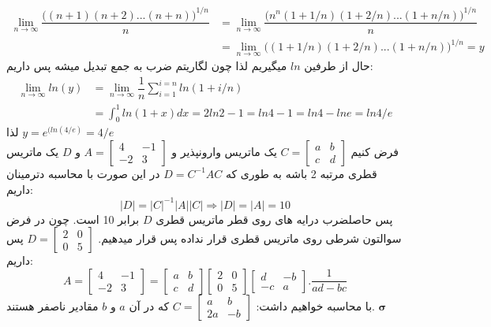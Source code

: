  
\begin{align*} 
\lim_{n\rightarrow \infty } \dfrac{{\Big( (n+1) (n+2)... (n+n)\Big)}^{1/n}}{n}&=\lim_{n\rightarrow \infty } \dfrac{{\Big(n^n (1+1/n) (1+2/n)... (1+n/n)\Big)}^{1/n} }{n} \\
&=\lim_{n\rightarrow \infty} {\Big((1+1/n) (1+2/n)... (1+n/n)\Big)}^{1/n}=y
\end{align*}
حال از طرفین $ln$  میگیریم لذا چون لگاریتم ضرب به جمع تبدیل میشه پس داریم:
\begin{align*} 
\lim_{n\rightarrow \infty} ln (y)&=\lim_{n\rightarrow \infty}\dfrac{1}{n} \sum_{i=1}^{i=n} ln(1+i/n) \\
&= \int_{0}^{1} ln(1+x) dx=2ln2-1=ln4-1=ln 4-ln e=ln 4/e
\end{align*}
لذا
$y= e^{(ln(4/e)}=4/e$\\
فرض کنیم
 $C=\begin{bmatrix}
a & b \\ 
c & d
\end{bmatrix} $
  یک ماتریس وارونپذیر  و
 $A=\begin{bmatrix}
4 & -1 \\ 
-2 & 3
\end{bmatrix} $
و $D$ یک ماتریس قطری مرتبه 2 باشه به طوری که
$D=C^{-1}AC$
در این صورت با محاسبه دترمینان داریم:
$$  \vert D \vert = {\vert  C \vert}^{-1} \vert  A \vert  \vert C\vert \Longrightarrow \vert D \vert = {\vert A \vert}=10$$
پس حاصلضرب درایه های روی قطر ماتریس قطری $D$  برابر 10 است. چون در فرض سوالتون شرطی روی ماتریس قطری قرار نداده پس قرار میدهیم.
$D=\begin{bmatrix}
2 & 0 \\ 
0 & 5
\end{bmatrix} 
$
پس داریم:
$$
A=\begin{bmatrix}
4 & -1 \\ 
-2 & 3
\end{bmatrix}=\begin{bmatrix}
a & b \\ 
c & d
\end{bmatrix} \begin{bmatrix}
2 & 0 \\ 
0 & 5
\end{bmatrix} \begin{bmatrix}
d & -b \\ 
-c & a
\end{bmatrix}.\dfrac{1}{ad-bc}
$$
با محاسبه خواهیم داشت:
$C= \begin{bmatrix}
a & b \\ 
2a & -b
\end{bmatrix}$ 
که در آن $a$ و $b$ مقادیر ناصفر هستند. 
${ \pmb\sigma} $


